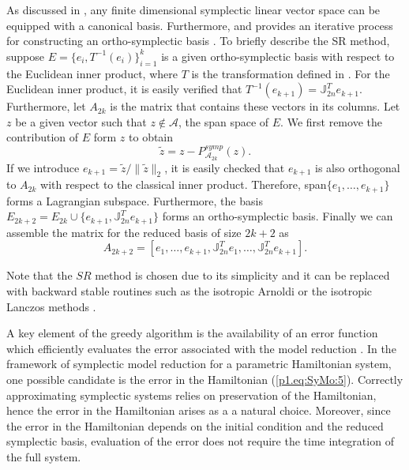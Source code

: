 As discussed in , any finite dimensional symplectic linear vector space can be equipped with a canonical basis. Furthermore,  and  provides an iterative process for constructing an ortho-symplectic basis \cite{Salam2014}. To briefly describe the SR method, suppose $E=\{ e_i, T^{-1}(e_i) \}_{i=1}^{k}$ is a given ortho-symplectic basis with respect to the Euclidean inner product, where $T$ is the transformation defined in . For the Euclidean inner product, it is easily verified that $T^{-1}(e_{k+1}) =  \mathbb J_{2n}^T e_{k+1}$. Furthermore, let $A_{2k}$ is the matrix that contains these vectors in its columns. Let $z$ be a given vector such that $z\not \in \mathcal A$, the span space of $E$. We first remove the contribution of $E$ form $z$ to obtain
\begin{equation} \label{p1.eq:SyMo:14.1}
	\tilde z = z - P_{\mathcal A_{2k}}^{symp}(z).
\end{equation}
If we introduce $e_{k+1} = \tilde z / \| \tilde z \|_2$, it is easily checked that $e_{k+1}$ is also orthogonal to $A_{2k}$ with respect to the classical inner product. Therefore, span$\{e_1,\dots,e_{k+1}\}$ forms a Lagrangian subspace. Furthermore, the basis $E_{2k+2}= E_{2k} \cup \{ e_{k+1} , \mathbb J^T_{2n} e_{k+1} \}$ forms an ortho-symplectic basis. Finally we can assemble the matrix for the reduced basis of size $2k+2$ as
\begin{equation} \label{p1.eq:SyMo:14.2}
	A_{2k+2} = [e_1,\dots,e_{k+1},\mathbb J_{2n}^T e_1,\dots,\mathbb J_{2n}^T e_{k+1} ].
\end{equation}

Note that the $SR$ method is chosen due to its simplicity and it can be replaced with backward stable routines such as the isotropic Arnoldi or the isotropic Lanczos methods \cite{doi:10.1137/S1064827500366434}.

A key element of the greedy algorithm is the availability of an error function which efficiently evaluates the error associated with the model reduction \cite{hesthaven2015certified}. In the framework of symplectic model reduction for a parametric Hamiltonian system, one possible candidate is the error in the Hamiltonian (\ref{p1.eq:SyMo:5}). Correctly approximating symplectic systems relies on preservation of the Hamiltonian, hence the error in the Hamiltonian arises as a a natural choice. Moreover, since the error in the Hamiltonian depends on the initial condition and the reduced symplectic basis, evaluation of the error does not require the time integration of the full system. 

